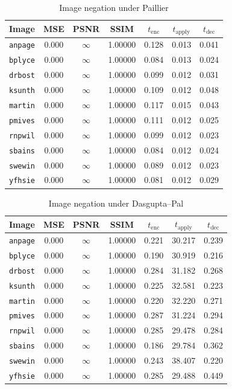 \begin{table}[h]
	\caption{Image negation under Paillier}
	\label{tbl:neg-pal}
    \begin{tabular}{lcccccc}
        \toprule
        Image & MSE  & PSNR & SSIM & $t_\text{enc}$ & $t_\text{apply}$ & $t_\text{dec}$ \\ \midrule
        \texttt{anpage} & 0.000 & $\infty$ & 1.00000 & 0.128 & 0.013 & 0.041 \\
		\texttt{bplyce} & 0.000 & $\infty$ & 1.00000 & 0.084 & 0.013 & 0.024 \\
		\texttt{drbost} & 0.000 & $\infty$ & 1.00000 & 0.099 & 0.012 & 0.031 \\
		\texttt{ksunth} & 0.000 & $\infty$ & 1.00000 & 0.109 & 0.012 & 0.048 \\
		\texttt{martin} & 0.000 & $\infty$ & 1.00000 & 0.117 & 0.015 & 0.043 \\
		\texttt{pmives} & 0.000 & $\infty$ & 1.00000 & 0.111 & 0.012 & 0.025 \\
		\texttt{rnpwil} & 0.000 & $\infty$ & 1.00000 & 0.099 & 0.012 & 0.023 \\
		\texttt{sbains} & 0.000 & $\infty$ & 1.00000 & 0.084 & 0.012 & 0.024 \\
		\texttt{swewin} & 0.000 & $\infty$ & 1.00000 & 0.089 & 0.012 & 0.023 \\
		\texttt{yfhsie} & 0.000 & $\infty$ & 1.00000 & 0.081 & 0.012 & 0.029 \\
		\bottomrule
    \end{tabular}
\end{table}
\begin{table}[h]
	\caption{Image negation under Dasgupta--Pal}
	\label{tbl:neg-dp}
    \begin{tabular}{lcccccc}
        \toprule
        Image & MSE  & PSNR & SSIM & $t_\text{enc}$ & $t_\text{apply}$ & $t_\text{dec}$ \\ \midrule
		\texttt{anpage} & 0.000 & $\infty$ & 1.00000 & 0.221 & 30.217 & 0.239 \\
		\texttt{bplyce} & 0.000 & $\infty$ & 1.00000 & 0.190 & 30.919 & 0.216 \\
		\texttt{drbost} & 0.000 & $\infty$ & 1.00000 & 0.284 & 31.182 & 0.268 \\
		\texttt{ksunth} & 0.000 & $\infty$ & 1.00000 & 0.225 & 32.581 & 0.223 \\
		\texttt{martin} & 0.000 & $\infty$ & 1.00000 & 0.220 & 32.220 & 0.271 \\
		\texttt{pmives} & 0.000 & $\infty$ & 1.00000 & 0.287 & 31.224 & 0.294 \\
		\texttt{rnpwil} & 0.000 & $\infty$ & 1.00000 & 0.285 & 29.478 & 0.284 \\
		\texttt{sbains} & 0.000 & $\infty$ & 1.00000 & 0.186 & 29.784 & 0.362 \\
		\texttt{swewin} & 0.000 & $\infty$ & 1.00000 & 0.243 & 38.407 & 0.220 \\
		\texttt{yfhsie} & 0.000 & $\infty$ & 1.00000 & 0.285 & 29.488 & 0.449 \\		
		\bottomrule
        \end{tabular}
\end{table}

